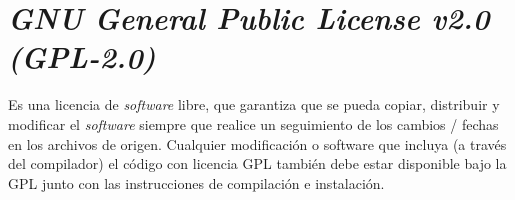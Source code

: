 \section{\textit{GNU General Public License v2.0 (GPL-2.0) }}

	Es una licencia de \textit{software} libre, que garantiza que se pueda copiar, distribuir y modificar el \textit{software} siempre que realice un seguimiento de los cambios / fechas en los archivos de origen. Cualquier modificación o software que incluya (a trav\'es del compilador) el código con licencia GPL también debe estar disponible bajo la GPL junto con las instrucciones de compilación e instalación.
